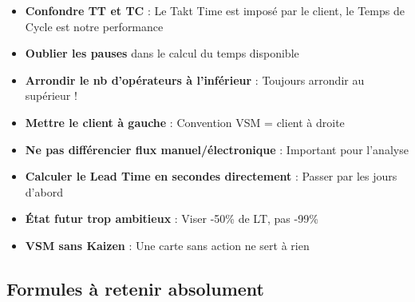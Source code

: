 \documentclass[12pt,a4paper]{article}
\begin{document}
\begin{tcolorbox}[colback=orange!10, colframe=orange!70!black, title=Pièges classiques]
\begin{itemize}[leftmargin=*]
    \item \textbf{Confondre TT et TC} : Le Takt Time est imposé par le client, le Temps de Cycle est notre performance
    \item \textbf{Oublier les pauses} dans le calcul du temps disponible
    \item \textbf{Arrondir le nb d'opérateurs à l'inférieur} : Toujours arrondir au supérieur !
    \item \textbf{Mettre le client à gauche} : Convention VSM = client à droite
    \item \textbf{Ne pas différencier flux manuel/électronique} : Important pour l'analyse
    \item \textbf{Calculer le Lead Time en secondes directement} : Passer par les jours d'abord
    \item \textbf{État futur trop ambitieux} : Viser -50\% de LT, pas -99\%
    \item \textbf{VSM sans Kaizen} : Une carte sans action ne sert à rien
\end{itemize}
\end{tcolorbox}

\subsection{Formules à retenir absolument}
\end{document}
